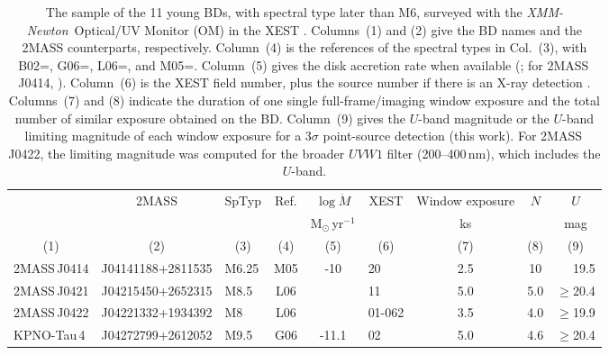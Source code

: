 \documentclass{aa}
\newcommand{\xmm}{{\it XMM-Newton}}
\begin{document}
\begin{table}[!ht]
\caption{The sample of the 11 young BDs, with spectral type later
    than M6, surveyed with the
 \xmm~Optical/UV Monitor (OM) in the XEST \citep{guedel06b}. Columns~(1)
and (2) give the BD names and the 2MASS counterparts, respectively. 
Column~(4) is the references of the spectral types in Col.~(3), with
B02=\citet{briceno02}, G06=\citet{guieu06}, L06=\citet{luhman06}, and M05=\citet{muzerolle05b}.
Column~(5) gives the disk accretion rate when available
  (\citealt{mohanty05}; for 2MASS\,J0414, \citealt{muzerolle05b}).
Column~(6) is the XEST field number, plus the source
number if there is an X-ray detection \citep{grosso06}. 
Columns~(7) and (8) indicate the duration of one single full-frame/imaging window
exposure and the total number of similar exposure obtained on the BD. 
Column~(9) gives the $U$-band magnitude or the
$U$-band limiting magnitude of each window exposure for a 3$\sigma$
point-source detection (this work). For 2MASS\,J0422, the limiting
magnitude was computed for the broader $UVW1$ filter (200--400\,nm),
which includes the $U$-band.}
\label{table:bd}
\vspace{-0.25cm}
\centering
\begin{tabular}{lclcclccr}
\hline\hline
\noalign{\smallskip}
\multicolumn{1}{c}{Name} & 2MASS & 
\multicolumn{1}{c}{SpTyp} &   \multicolumn{1}{c}{Ref.} & $
\log{\dot{M}}$ & \multicolumn{1}{c}{XEST} & \multicolumn{1}{c}{Window
exposure} & $N$ & \multicolumn{1}{c}{$U$}\\
     &                &                  &    & M$_\odot$\,yr$^{-1}$ &
& \multicolumn{1}{c}{ks} & & \multicolumn{1}{c}{mag} \\
\multicolumn{1}{c}{(1)} & (2) & \multicolumn{1}{c}{(3)} &
\multicolumn{1}{c}{(4)} & \multicolumn{1}{c}{(5)} & \multicolumn{1}{c}{(6)} &
\multicolumn{1}{c}{(7)} & \multicolumn{1}{c}{(8)}& \multicolumn{1}{c}{(9)}\\
\hline
2MASS\,J0414  & J04141188+2811535   & M6.25 & M05  & -10      & 20     & 2.5 & 10  & 19.5\\   
2MASS\,J0421  & J04215450+2652315   & M8.5 & L06  & \dotfill & 11     & 5.0 & 5.0 & $\ge$20.4\\
2MASS\,J0422  & J04221332+1934392   & M8   & L06  & \dotfill & 01-062 & 3.5 & 4.0 & $\ge$19.9\\
KPNO-Tau\,4   & J04272799+2612052   & M9.5  & G06  & -11.1    & 02     & 5.0 & 4.6 & $\ge$20.4 \\ 

\end{tabular}
\end{table}
\end{document}
